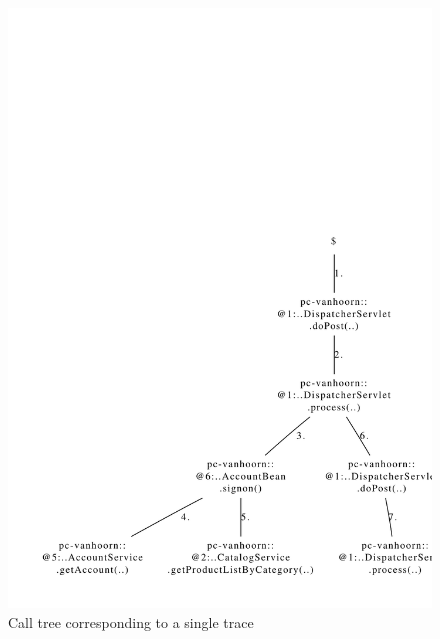 
\begin{figure}\centering
\includegraphics[width=\columnwidth]{figures/20090710-163529-jpetstore-250Threads-400sDuration-200sRampup-sequenceDiagram--20100428-callTree-61}
\caption{Call tree corresponding to a single trace%
}
\label{fig:vis:jpetDepCallTree}
\end{figure}

